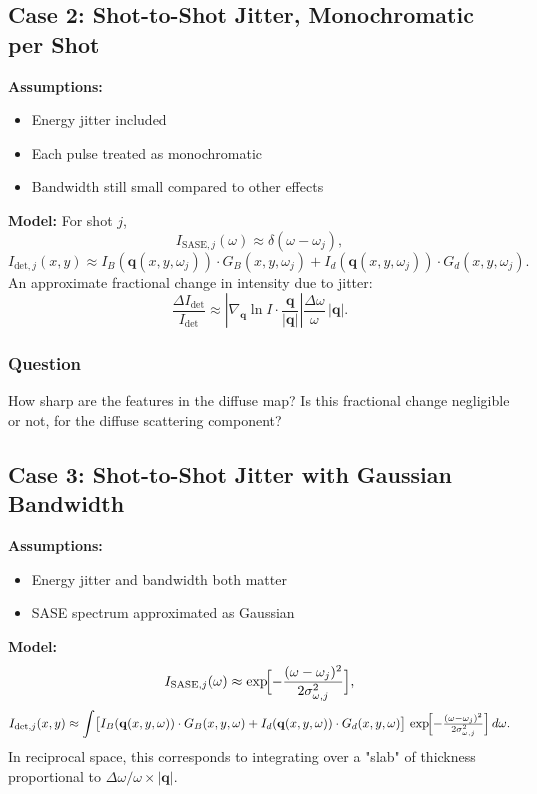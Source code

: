 \documentclass[12pt,a4paper]{article}
\begin{document}
\subsection{Case 2: Shot-to-Shot Jitter, Monochromatic per Shot}
\textbf{Assumptions:}
\begin{itemize}
\item Energy jitter included
\item Each pulse treated as monochromatic
\item Bandwidth still small compared to other effects
\end{itemize}
\textbf{Model:}
For shot $j$,
\begin{equation}
I_{\text{SASE},j}(\omega) \approx \delta(\omega - \omega_j),
\end{equation}
\begin{equation}
I_{\text{det},j}(x,y) \approx I_B(\mathbf{q}(x,y,\omega_j)) \cdot G_B(x,y,\omega_j) + I_d(\mathbf{q}(x,y,\omega_j)) \cdot G_d(x,y,\omega_j).
\end{equation}
An approximate fractional change in intensity due to jitter:
\begin{equation}
\frac{\Delta I_{\text{det}}}{I_{\text{det}}} \approx \left|\nabla_{\mathbf{q}} \ln I \cdot \frac{\mathbf{q}}{|\mathbf{q}|}\right|\frac{\Delta \omega}{\omega}\,|\mathbf{q}|.
\end{equation}

\subsubsection*{Question}
How sharp are the features in the diffuse map? Is this fractional change negligible or not, for the diffuse scattering component?

\subsection{Case 3: Shot-to-Shot Jitter with Gaussian Bandwidth}
\textbf{Assumptions:}
\begin{itemize}
\item Energy jitter and bandwidth both matter
\item SASE spectrum approximated as Gaussian
\end{itemize}
\textbf{Model:}
\begin{equation}
I_{\text{SASE},j}(\omega) \approx \exp\!\Bigl[-\frac{(\omega - \omega_j)^2}{2\sigma_{\omega,j}^2}\Bigr],
\end{equation}
\begin{equation}
I_{\text{det},j}(x,y) \approx \int \bigl[I_B(\mathbf{q}(x,y,\omega)) \cdot G_B(x,y,\omega) + I_d(\mathbf{q}(x,y,\omega)) \cdot G_d(x,y,\omega)\bigr]\,
\exp\!\Bigl[-\tfrac{(\omega - \omega_j)^2}{2\sigma_{\omega,j}^2}\Bigr]\, d\omega.
\end{equation}
In reciprocal space, this corresponds to integrating over a "slab" of thickness proportional to $\Delta \omega/\omega \times |\mathbf{q}|$.
\end{document}
